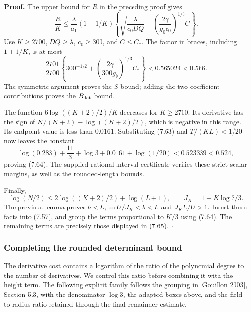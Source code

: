 \documentclass[
  11pt,
  a4paper,
]{article}
\begin{document}
\textbf{Proof.} The upper bound for \(R\) in the preceding proof gives
\[
\frac RK\le\frac{\lambda}{a_1}(1+1/K)
\left\{\sqrt{\frac{\lambda}{c_0DQ}}
+\left(\frac{2\gamma}{g_0c_0}\right)^{1/3}C\right\}.
\] Use \(K\ge2700\), \(DQ\ge\lambda\), \(c_0\ge300\), and \(C\le C_*\).
The factor in braces, including \(1+1/K\), is at most \[
\frac{2701}{2700}
\left\{300^{-1/2}+\left(\frac{2\gamma}{300g_0}\right)^{1/3}C_*\right\}
<0.565024<0.566.
\] The symmetric argument proves the \(S\) bound; adding the two
coefficient contributions proves the \(B_{\rm det}\) bound.

The function \(6\log((K+2)/2)/K\) decreases for \(K\ge2700\). Its
derivative has the sign of \(K/(K+2)-\log((K+2)/2)\), which is negative
in this range. Its endpoint value is less than \(0.0161\). Substituting
(7.63) and \(T/(KL)<1/20\) now leaves the constant \[
\log(0.283)+\frac{11}{3}+\log3+0.0161+\log(1/20)
<0.523339<0.524,
\] proving (7.64). The supplied rational interval certificate verifies
these strict scalar margins, as well as the rounded-length bounds.

Finally, \[
\log(N/2)\le2\log((K+2)/2)+\log(L+1),
\qquad J_K=1+K\log3/3.
\] The previous lemma proves \(b<L\), so \(U/J_K<b<L\) and \(J_KL/U>1\).
Insert these facts into (7.57), and group the terms proportional to
\(K/3\) using (7.64). The remaining terms are precisely those displayed
in (7.65). \(\square\)

\subsubsection{Completing the rounded determinant
bound}\label{completing-the-rounded-determinant-bound}

The derivative cost contains a logarithm of the ratio of the polynomial
degree to the number of derivatives. We control this ratio before
combining it with the height term. The following explicit family follows
the grouping in {[}Gouillon 2003{]}, Section 5.3, with the denominator
\(\log3\), the adapted boxes above, and the field-to-radius ratio
retained through the final remainder estimate.
\end{document}
